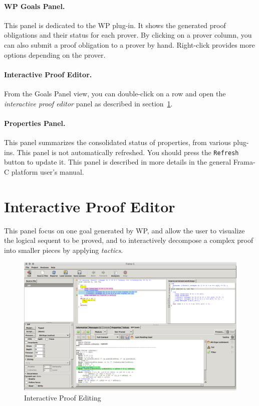 \paragraph{\textsf{WP} Goals Panel.}
This panel is dedicated to the \textsf{WP} plug-in. It shows the
generated proof obligations and their status for each prover.
By clicking on a prover
column, you can also submit a proof obligation to a prover by
hand. Right-click provides more options depending on the prover.

\paragraph{Interactive Proof Editor.}
From the Goals Panel view, you can double-click on a row and open the \emph{interactive proof editor} panel as described in section~\ref{wp-proof-editor}.

\paragraph{Properties Panel.} This panel summarizes the consolidated
status of properties, from various plug-ins. This panel is not
automatically refreshed. You should press the \texttt{Refresh} button
to update it. This panel is described in more details in the general
\textsf{Frama-C} platform user's manual.

\clearpage
\section{Interactive Proof Editor}
\label{wp-proof-editor}

This panel focus on one goal generated by \textsf{WP}, and allow the user to visualize the logical sequent to be proved, and to interactively decompose a complex proof into smaller pieces by applying \emph{tactics}.

\begin{figure}[htbp]
\begin{center}
\includegraphics[width=\textwidth]{wp-tip-run.png}
\end{center}
\caption{Interactive Proof Editing}
\label{wp-tip-run}
\end{figure}


